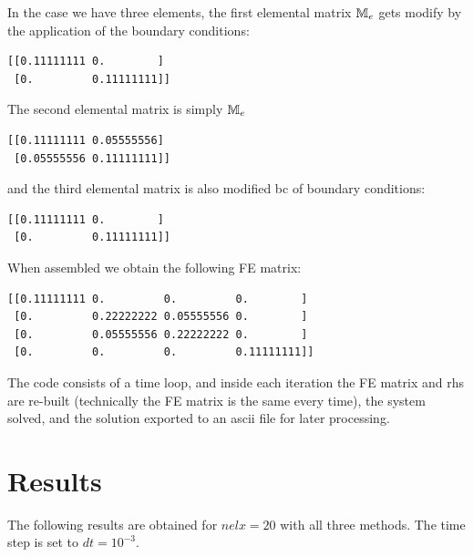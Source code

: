 In the case we have three elements, the first elemental matrix ${\mathbb{M}}_e$
gets modify by the application of the boundary conditions:
\begin{verbatim}
[[0.11111111 0.        ]
 [0.         0.11111111]]
\end{verbatim}
The second elemental matrix is simply ${\mathbb{M}}_e$
\begin{verbatim}
[[0.11111111 0.05555556]
 [0.05555556 0.11111111]]
\end{verbatim}
and the third elemental matrix is also modified bc of boundary conditions:
\begin{verbatim}
[[0.11111111 0.        ]
 [0.         0.11111111]]
\end{verbatim}
When assembled we obtain the following FE matrix:
\begin{verbatim}
[[0.11111111 0.         0.         0.        ]
 [0.         0.22222222 0.05555556 0.        ]
 [0.         0.05555556 0.22222222 0.        ]
 [0.         0.         0.         0.11111111]]
\end{verbatim}

The code consists of a time loop, and inside each iteration 
the FE matrix and rhs are re-built (technically the FE matrix 
is the same every time), the system solved, and the solution
exported to an ascii file for later processing.

\section*{Results}

The following results are obtained for $nelx=20$ with all three methods.
The time step is set to $dt=10^{-3}$. 

